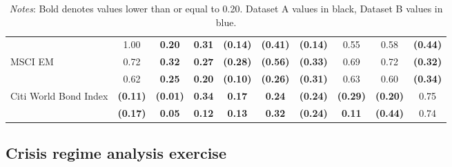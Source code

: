 \documentclass[12pt]{article}
\begin{document}
\begin{table}[H]
\begin{center}
{\begin{tabular}{@{}lccccccccc@{}}
                      & {\color[HTML]{303498} 1.00}            & {\color[HTML]{303498} \textbf{0.20}}   & {\color[HTML]{303498} \textbf{0.31}}   & {\color[HTML]{303498} \textbf{(0.14)}} & {\color[HTML]{303498} \textbf{(0.41)}} & {\color[HTML]{303498} \textbf{(0.14)}} & {\color[HTML]{303498} 0.55}            & {\color[HTML]{303498} 0.58}            & {\color[HTML]{303498} \textbf{(0.44)}} \\
MSCI EM               & 0.72                                   & \textbf{0.32}                          & \textbf{0.27}                          & \textbf{(0.28)}                        & \textbf{(0.56)}                        & \textbf{(0.33)}                        & 0.69                                   & 0.72                                   & \textbf{(0.32)}                        \\
                      & {\color[HTML]{303498} 0.62}            & {\color[HTML]{303498} \textbf{0.25}}   & {\color[HTML]{303498} \textbf{0.20}}   & {\color[HTML]{303498} \textbf{(0.10)}} & {\color[HTML]{303498} \textbf{(0.26)}} & {\color[HTML]{303498} \textbf{(0.31)}} & {\color[HTML]{303498} 0.63}            & {\color[HTML]{303498} 0.60}            & {\color[HTML]{303498} \textbf{(0.34)}} \\ \midrule
Citi World Bond Index & \textbf{(0.11)}                        & \textbf{(0.01)}                        & \textbf{0.34}                          & \textbf{0.17}                          & \textbf{0.24}                          & \textbf{(0.24)}                        & \textbf{(0.29)}                        & \textbf{(0.20)}                        & 0.75                                   \\
                      & {\color[HTML]{303498} \textbf{(0.17)}} & {\color[HTML]{303498} \textbf{0.05}}   & {\color[HTML]{303498} \textbf{0.12}}   & {\color[HTML]{303498} \textbf{0.13}}   & {\color[HTML]{303498} \textbf{0.32}}   & {\color[HTML]{303498} \textbf{(0.24)}} & {\color[HTML]{303498} \textbf{0.11}}   & {\color[HTML]{303498} \textbf{(0.44)}} & {\color[HTML]{303498} 0.74}            \\ \bottomrule
\end{tabular}}
\bigskip
\caption*{\textit{Notes}: Bold denotes values lower than or equal to 0.20. Dataset A values in black, Dataset B values in blue.}
\end{center}
\end{table}

\subsection{Crisis regime analysis exercise}
\end{document}
